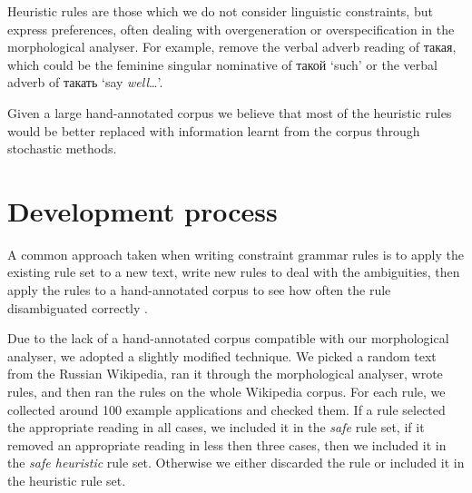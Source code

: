 \documentclass[11pt]{article}
\newcommand{\rus}[1]{\foreignlanguage{russian}{#1}}
\begin{document}




Heuristic rules are those which we do not consider linguistic constraints, but express
preferences, often dealing with overgeneration or overspecification in the morphological
analyser. For example, remove the verbal adverb reading of \rus{такая}, which could be 
the feminine singular nominative of \rus{такой} `such' or the verbal adverb 
of \rus{такать} `say \emph{well}\ldots'.


Given a large hand-annotated corpus we believe that most of the heuristic rules would be 
better replaced with information learnt from the corpus through stochastic methods. 



\section{Development process}

A common approach taken when writing constraint grammar rules is to 
apply the existing rule set to a new text, write new rules to deal with the 
ambiguities, then apply the rules to a hand-annotated corpus to see
how often the rule disambiguated correctly \cite{voutilainen99}.

Due to the lack of a hand-annotated corpus compatible with our morphological
analyser, we adopted a slightly modified technique. We picked a random text
from the Russian Wikipedia, ran it through the morphological analyser, wrote 
rules, and then ran the rules on the whole Wikipedia corpus. For each rule,
we collected around 100 example applications and checked them. If a rule
selected the appropriate reading in all cases, we included it in the \emph{safe}
rule set, if it removed an appropriate reading in less then three cases, 
then we included it in the \emph{safe heuristic} rule set. Otherwise we either
discarded the rule or included it in the heuristic rule set.
\end{document}
